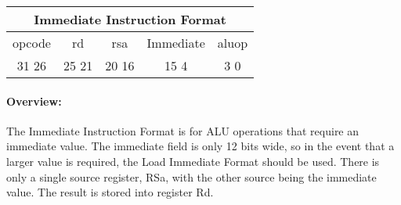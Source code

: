 \documentclass[letterpaper, 11pt]{article}
\begin{document}
\begin{center}
		\begin{tabular}{|c|c|c|c|c|}
			\multicolumn{5}{c}{Immediate Instruction Format}\\ \hline
				\hspace{2pt} opcode \hspace{2pt} & \hspace{5pt} rd \hspace{5pt} &  \hspace{4pt} rsa \hspace{4pt} & \hspace{10pt}Immediate  \hspace{10pt} & \hspace{3pt} aluop \hspace{3pt}   \\	\hline
			31 \hfill 26& 25 \hfill 21 &20 \hfill  16& 15  \hfill   4&3 \hfill   0\\ \hline
		
	\end{tabular}
\end{center}
\paragraph{Overview:}The Immediate Instruction Format is for ALU operations that require an immediate value. The immediate field
is only 12 bits wide, so in the event that a larger value is required, the Load Immediate Format should be used. There is only a single
source register, RSa, with the other source being the immediate value. The result is stored into register Rd.
\end{document}
